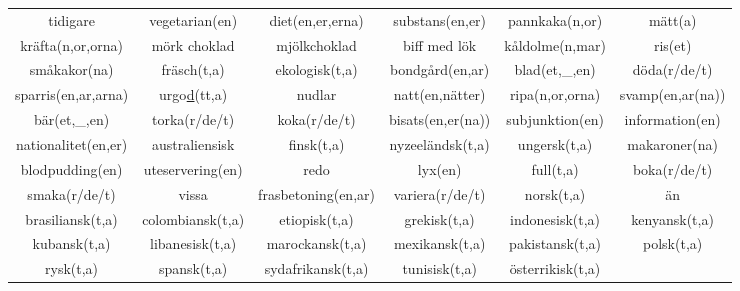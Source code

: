 \begin{center}
\begin{adjustwidth}{-2.5cm}{}
\begin{tabular}{|c c c c c c|}
            tidigare & vegetarian(en) & diet(en,er,erna) & substans(en,er) & pannkaka(n,or) & mätt(a) \\
            kräfta(n,or,orna) & mörk choklad & mjölkchoklad & biff med lök & kåldolme(n,mar) & ris(et) \\
            småkakor(na) & fräsch(t,a) & ekologisk(t,a) & bondgård(en,ar) & blad(et,\_,en) & döda(r/de/t) \\
            sparris(en,ar,arna) & urgo\underline{d}(tt,a) & nudlar & natt(en,nätter) & ripa(n,or,orna) & svamp(en,ar(na)) \\
            bär(et,\_,en) & torka(r/de/t) & koka(r/de/t) & bisats(en,er(na)) & subjunktion(en) & information(en) \\
            nationalitet(en,er) & australiensisk & finsk(t,a) & nyzeeländsk(t,a) & ungersk(t,a) & makaroner(na) \\
            blodpudding(en) & uteservering(en) & redo & lyx(en) & full(t,a) & boka(r/de/t) \\
            smaka(r/de/t) & vissa & frasbetoning(en,ar) & variera(r/de/t) & norsk(t,a) & än \\
            brasiliansk(t,a) & colombiansk(t,a) & etiopisk(t,a) & grekisk(t,a) & indonesisk(t,a) & kenyansk(t,a) \\
            kubansk(t,a) & libanesisk(t,a) & marockansk(t,a) & mexikansk(t,a) & pakistansk(t,a) & polsk(t,a) \\
            rysk(t,a) & spansk(t,a) & sydafrikansk(t,a) & tunisisk(t,a) & österrikisk(t,a) &  \\
            \hline
        \end{tabular}
    \end{adjustwidth}
\end{center}

